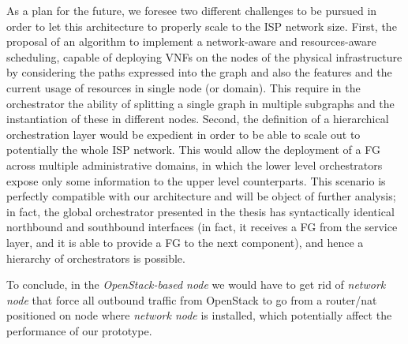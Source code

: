 As a plan for the future, we foresee two different challenges to be pursued in order to let this architecture to properly scale to the ISP network size. 
First, the proposal of an algorithm to implement a network-aware and resources-aware scheduling, capable of deploying VNFs on the nodes of the physical infrastructure by considering the paths expressed into the graph and also the features and the current usage of resources in single node (or domain). This require in the orchestrator the ability of splitting a single graph in multiple subgraphs and the instantiation of these in different nodes.
Second, the definition of a hierarchical orchestration layer would be expedient in order to be able to scale out to potentially the whole ISP network. 
This would allow the deployment of a FG across multiple administrative domains, in which the lower level orchestrators expose only some information to the upper level counterparts. 
This scenario is perfectly compatible with our architecture and will be object of further analysis; in fact, the global orchestrator presented in the thesis has syntactically identical northbound and southbound interfaces (in fact, it receives a FG from the service layer, and it is able to provide a FG to the next component), and hence a hierarchy of orchestrators is possible. 

To conclude, in the \textit{OpenStack-based node} we would have to get rid of \textit{network node} that force all outbound traffic from OpenStack to go from a router/nat positioned on node where \textit{network node} is installed,  which potentially affect the performance of our prototype.
